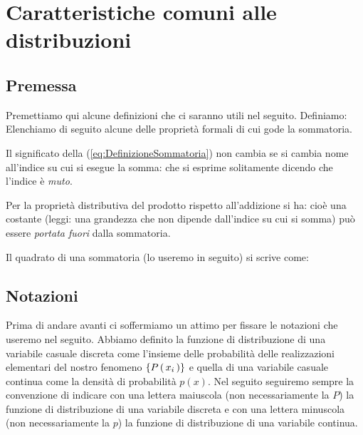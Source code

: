 \section{Caratteristiche comuni alle distribuzioni}


\subsection{Premessa}

Premettiamo qui alcune definizioni che ci saranno utili nel seguito.
Definiamo:
Elenchiamo di seguito alcune delle propriet\`a formali di cui gode la
sommatoria.
\begin{numlist}
\item{Il significato della (\ref{eq:DefinizioneSommatoria}) non cambia
se si cambia nome all'indice su cui si esegue la somma:
che si esprime solitamente dicendo che l'indice \`e {\itshape muto}.
}
\item{Per la propriet\`a distributiva del prodotto rispetto all'addizione
si ha:
cio\`e una costante (leggi: una grandezza che non dipende dall'indice su
cui si somma) pu\`o essere {\itshape portata fuori} dalla sommatoria.
}
\item{Il quadrato di una sommatoria (lo useremo in seguito) si scrive come:
}
\end{numlist}

\begin{exemplify}


\end{exemplify}


\subsection{Notazioni}

Prima di andare avanti ci soffermiamo un attimo per fissare
le notazioni che useremo nel seguito.
Abbiamo definito la funzione di distribuzione di una variabile
casuale discreta come l'insieme delle probabilit\`a delle realizzazioni
elementari del nostro fenomeno $\{ \displaystyle P\left(\, x_i \, \right) \}$ e quella di una variabile
casuale continua come la densit\`a di probabilit\`a $p(x)$.
Nel seguito seguiremo sempre la convenzione di indicare con una
lettera maiuscola (non necessariamente la $P$) la funzione di distribuzione
di una variabile discreta e con una lettera minuscola (non necessariamente
la $p$) la funzione di distribuzione di una variabile continua.

